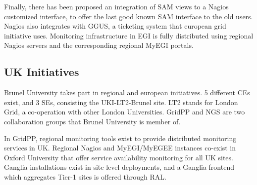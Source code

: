 Finally, there has been proposed an integration of \ac{SAM} views to a Nagios customized interface, to offer the last good known \ac{SAM} interface to the old users. Nagios also integrates with \ac{GGUS}, a ticketing system that european grid initiative uses. Monitoring infrastructure in EGI is fully distributed using regional Nagios servers and the corresponding regional MyEGI portals.

\subsection{UK Initiatives}
Brunel University takes part in regional and european initiatives. 5 different \acp{CE} exist, and 3 \acp{SE}, consisting the UKI-LT2-Brunel site. LT2 stands for London Grid, a co-operation with other London Universities. \ac{GridPP} and \ac{NGS} are two collaboration groups that Brunel University is member of.

In \ac{GridPP}, regional monitoring tools exist to provide distributed monitoring services in UK. Regional Nagios and MyEGI/MyEGEE instances co-exist in Oxford University that offer service availability monitoring for all UK sites. Ganglia installations exist in site level deployments, and a Ganglia frontend which aggregates Tier-1 sites is offered through \ac{RAL}.

